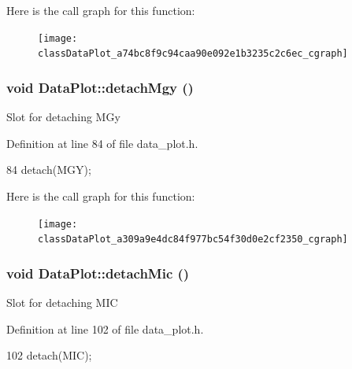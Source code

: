 Here is the call graph for this function:\nopagebreak
\begin{figure}[H]
\begin{center}
\leavevmode
\texttt{[image: classDataPlot\_a74bc8f9c94caa90e092e1b3235c2c6ec\_cgraph]}
\end{center}
\end{figure}


\hypertarget{classDataPlot_a309a9e4dc84f977bc54f30d0e2cf2350}{
\subsubsection[{detachMgy}]{\setlength{\rightskip}{0pt plus 5cm}void DataPlot::detachMgy ()}}
\label{classDataPlot_a309a9e4dc84f977bc54f30d0e2cf2350}
Slot for detaching MGy 

Definition at line 84 of file data\_\-plot.h.




\begin{DoxyCode}
84 { detach(MGY); }
\end{DoxyCode}




Here is the call graph for this function:\nopagebreak
\begin{figure}[H]
\begin{center}
\leavevmode
\texttt{[image: classDataPlot\_a309a9e4dc84f977bc54f30d0e2cf2350\_cgraph]}
\end{center}
\end{figure}


\hypertarget{classDataPlot_a42a2f46b248f64482153739201fc7d2b}{
\subsubsection[{detachMic}]{\setlength{\rightskip}{0pt plus 5cm}void DataPlot::detachMic ()}}
\label{classDataPlot_a42a2f46b248f64482153739201fc7d2b}
Slot for detaching MIC 

Definition at line 102 of file data\_\-plot.h.




\begin{DoxyCode}
102 { detach(MIC); }
\end{DoxyCode}




